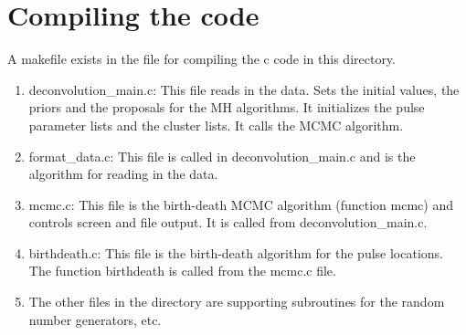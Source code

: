 \documentclass[12pt, oneside]{article}   	%
\begin{document}
\section{Compiling the code}
A makefile exists in the file for compiling the c code in this directory.

\begin{enumerate}
\item deconvolution\_main.c: This file reads in the data. Sets the initial values, the priors and the proposals for the MH algorithms. It initializes the pulse parameter lists and the cluster lists.  It calls the MCMC algorithm.
\item format\_data.c: This file is called in deconvolution\_main.c and is the algorithm for reading in the data.
\item mcmc.c: This file is the birth-death MCMC algorithm (function mcmc) and controls screen and file output. It is called from deconvolution\_main.c.
\item birthdeath.c: This file is the birth-death algorithm for the pulse locations.  The function birthdeath is called from the mcmc.c file.
\item The other files in the directory are supporting subroutines for the random number generators, etc.
\end{enumerate}
\end{document}
